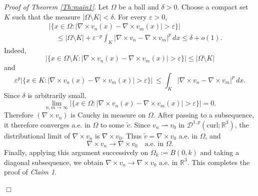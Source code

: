 \documentclass[12pt,leqno,twoside]{amsart}
\newenvironment{altproof}[1]
{\noindent%
{\em Proof of {#1}}.}
{\nopagebreak\mbox{}\hfill $\Box$\par\addvspace{0.5cm}}
\newcommand{\wt}{\widetilde}
\newcommand{\eps}{\varepsilon}
\def\R{\mathbb{R}}
\def\curl{\mathrm{curl}}
\def\Wc{\mathscr{W}}
\def\rh{\rightharpoonup}
\newcommand{\cD}{{\mathcal D}}
\def\r{\mathbb{R}}
\def\r3{\mathbb{R}^3}
\def\Wc{\cD^{1,p}(\curl;\R^3)}
\def\eps{\varepsilon}
\def\rh{\rightharpoonup}
\def\wt{\widetilde}
\def\curlop{\nabla\times}
\numberwithin{equation}{section}
\begin{document}
\begin{altproof}{Theorem \ref{Th:main1}}
Let $\Omega$ be a ball and $\delta>0$. Choose a compact set $K$ such that the measure $|\Omega\setminus K|<\delta$. For every $\varepsilon>0$,
 \begin{eqnarray*}
 	&&\big|\{x\in\Omega:
 	|\curlop v_n(x)-\curlop v_m(x)|>\varepsilon\}\big|\\
 	&&\quad\le
 	|\Omega\setminus K|
 	+\varepsilon^{-p}
 	\int_{K}|\curlop v_n-\curlop v_m|^p\,dx
\leq \delta +o(1).
 \end{eqnarray*}
Indeed, 
 \[
 \big|\{x\in\Omega\setminus K: |\curlop v_n(x)-\curlop v_m(x)|>\varepsilon\}\big| \le |\Omega\setminus K|
 \]
 and 
 \[
 \eps^p\big|\{x\in K:	|\curlop v_n(x)-\curlop v_m(x)|>\varepsilon\}\big|\ \le \int_{K}|\curlop v_n-\curlop v_m|^p\,dx.
 \]
Since $\delta$ is arbitrarily small,
$$\lim_{n,m\to\infty}\big|\{x\in\Omega:
|\curlop v_n(x)-\curlop v_m(x)|>\varepsilon\}\big|=0.$$
Therefore $(\curlop v_n)$ is Cauchy in measure on $\Omega$.
 After passing to a subsequence, it therefore converges
 a.e. in $\Omega$ to some $\wt v$.
 Since $v_n\rh v_0$ in $\Wc$,
the distributional limit of $\curlop v_n$ is
$\curlop v_0$. Thus $\wt v=\curlop v_0$ a.e. in $\Omega$,
and
\begin{equation}\label{eq15}
\curlop v_n\longrightarrow\curlop v_0
\quad\text{a.e. in }\Omega.
\end{equation}
Finally, applying this argument successively on
$\Omega_k:=B(0,k)$ and taking a diagonal subsequence,
we obtain $\curlop v_n\to\curlop v_0$ a.e. in $\r3$.
This completes the proof of {\em Claim 1}.


\medskip


\end{altproof}
\end{document}
